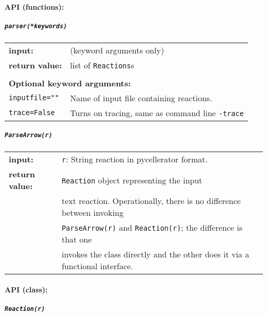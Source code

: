 

\paragraph{API (functions):}

\subparagraph{\tt parser(*keywords)\\}

\begin{tabular}{ll}
\textbf{input:} & (keyword arguments only) \\
\textbf{return value:}& list of {\tt Reactions}s  \\  \\
\multicolumn{2}{l}{\textbf{Optional keyword arguments:}}\\
{\tt inputfile=""} & Name of input file containing reactions.\\
{\tt trace=False} & Turns on tracing, same as command line {\tt -trace}
\end{tabular}

\subparagraph{\tt ParseArrow(r)\\}

\begin{tabular}{ll}
\textbf{input:} & {\tt r}: String reaction in pycellerator format. \\
\textbf{return value:} & {\tt Reaction} object representing the input \\
& text reaction.  Operationally, there is no difference between invoking \\
& {\tt ParseArrow(r)} and {\tt Reaction(r)}; the difference is that one \\
& invokes the class directly and the other does it via a functional interface.
\end{tabular}


\paragraph{API (class):}

\subparagraph{\tt Reaction(r)\\}

